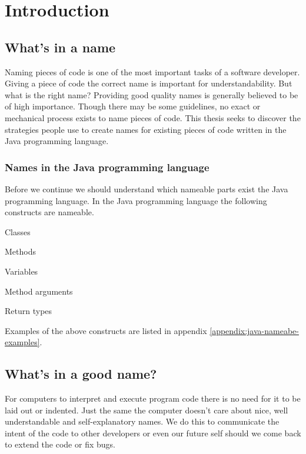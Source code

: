 \section{Introduction}

\subsection{What's in a name}

Naming pieces of code is one of the most important tasks of a software developer. Giving a piece of code the correct name is important for understandability. But what is the right name? Providing good quality names is generally believed to be of high importance. Though there may be some guidelines, no exact or mechanical process exists to name pieces of code. This thesis seeks to discover the strategies people use to create names for existing pieces of code written in the Java programming language.

\subsubsection{Names in the Java programming language}


Before we continue we should understand which nameable parts exist the Java programming language.
In the Java programming language the following constructs are nameable.\cite{javaLangSpec}

\begin{list}{-}{}
\item Classes
\item Methods
\item Variables
\item Method arguments
\item Return types
\end{list}

Examples of the above constructs are listed in appendix \ref{appendix:java-nameabe-examples}.

\subsection{What's in a good name?}

For computers to interpret and execute program code there is no need for it to be laid out or indented. Just the same the computer doesn't care about nice, well understandable and self-explanatory names. We do this to communicate the intent of the code to other developers or even our future self should we come back to extend the code or fix bugs.

